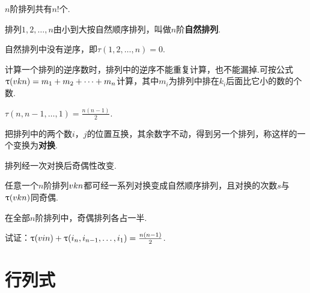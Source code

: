 \begin{property}
\(n\)阶排列共有\(n!\)个.
\end{property}

\begin{definition}
排列\(1,2,\dotsc,n\)由小到大按自然顺序排列，叫做\(n\)阶\textbf{自然排列}.
\end{definition}

\begin{property}
自然排列中没有逆序，即\(\tau(1,2,\dotsc,n)=0\).
\end{property}

\begin{theorem}
计算一个排列的逆序数时，排列中的逆序不能重复计算，也不能漏掉.可按公式\(\uptau(v{k}{n})=m_1+m_2+\dotsb+m_n\)计算，其中\(m_i\)为排列中排在\(k_i\)后面比它小的数的个数.
\end{theorem}

\begin{property}
\(\tau(n,n-1,\dotsc,1)=\frac{n(n-1)}{2}\).
\end{property}

\begin{definition}
把排列中的两个数\(i\)，\(j\)的位置互换，其余数字不动，得到另一个排列，称这样的一个变换为\textbf{对换}.
\end{definition}

\begin{theorem}
排列经一次对换后奇偶性改变.
\end{theorem}

\begin{theorem}
任意一个\(n\)阶排列\(v{k}{n}\)都可经一系列对换变成自然顺序排列，且对换的次数\(s\)与\(\uptau(v{k}{n})\)同奇偶.
\end{theorem}

\begin{theorem}
在全部\(n\)阶排列中，奇偶排列各占一半.
\end{theorem}

\begin{example}
试证：\(\uptau(v{i}{n})+\uptau(i_n,i_{n-1},\dotsc,i_1)=\frac{n(n-1)}{2}\).
\end{example}

\section{行列式}
